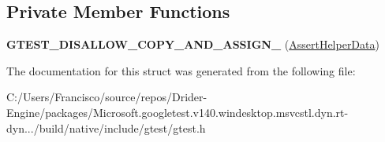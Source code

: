 \subsection*{Private Member Functions}
\begin{DoxyCompactItemize}
\item 
\mbox{\label{structtesting_1_1internal_1_1_assert_helper_1_1_assert_helper_data_a5cfdd2fca371e33566ffdb2357606df2}} 
{\bfseries G\+T\+E\+S\+T\+\_\+\+D\+I\+S\+A\+L\+L\+O\+W\+\_\+\+C\+O\+P\+Y\+\_\+\+A\+N\+D\+\_\+\+A\+S\+S\+I\+G\+N\+\_\+} (\hyperlink{structtesting_1_1internal_1_1_assert_helper_1_1_assert_helper_data}{Assert\+Helper\+Data})
\end{DoxyCompactItemize}


The documentation for this struct was generated from the following file\+:\begin{DoxyCompactItemize}
\item 
C\+:/\+Users/\+Francisco/source/repos/\+Drider-\/\+Engine/packages/\+Microsoft.\+googletest.\+v140.\+windesktop.\+msvcstl.\+dyn.\+rt-\/dyn.../build/native/include/gtest/gtest.\+h\end{DoxyCompactItemize}
